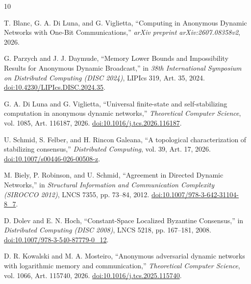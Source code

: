 \documentclass[11pt]{article}
\theoremstyle{remark}
\begin{document}
\begin{thebibliography}{10}

T. Blanc, G. A. Di Luna, and G. Viglietta,
``Computing in Anonymous Dynamic Networks with One-Bit Communications,''
\emph{arXiv preprint arXiv:2607.08358v2}, 2026.

G. Parzych and J. J. Daymude,
``Memory Lower Bounds and Impossibility Results for Anonymous Dynamic Broadcast,''
in \emph{38th International Symposium on Distributed Computing (DISC 2024)},
LIPIcs 319, Art. 35, 2024.
\href{https://doi.org/10.4230/LIPIcs.DISC.2024.35}{doi:10.4230/LIPIcs.DISC.2024.35}.

G. A. Di Luna and G. Viglietta,
``Universal finite-state and self-stabilizing computation in anonymous dynamic networks,''
\emph{Theoretical Computer Science}, vol. 1085, Art. 116187, 2026.
\href{https://doi.org/10.1016/j.tcs.2026.116187}{doi:10.1016/j.tcs.2026.116187}.

U. Schmid, S. Felber, and H. Rincon Galeana,
``A topological characterization of stabilizing consensus,''
\emph{Distributed Computing}, vol. 39, Art. 17, 2026.
\href{https://doi.org/10.1007/s00446-026-00508-z}{doi:10.1007/s00446-026-00508-z}.

M. Biely, P. Robinson, and U. Schmid,
``Agreement in Directed Dynamic Networks,''
in \emph{Structural Information and Communication Complexity (SIROCCO 2012)},
LNCS 7355, pp. 73--84, 2012.
\href{https://doi.org/10.1007/978-3-642-31104-8_7}{doi:10.1007/978-3-642-31104-8\_7}.

D. Dolev and E. N. Hoch,
``Constant-Space Localized Byzantine Consensus,''
in \emph{Distributed Computing (DISC 2008)}, LNCS 5218, pp. 167--181, 2008.
\href{https://doi.org/10.1007/978-3-540-87779-0_12}{doi:10.1007/978-3-540-87779-0\_12}.

D. R. Kowalski and M. A. Mosteiro,
``Anonymous adversarial dynamic networks with logarithmic memory and communication,''
\emph{Theoretical Computer Science}, vol. 1066, Art. 115740, 2026.
\href{https://doi.org/10.1016/j.tcs.2025.115740}{doi:10.1016/j.tcs.2025.115740}.

\end{thebibliography}
\end{document}
